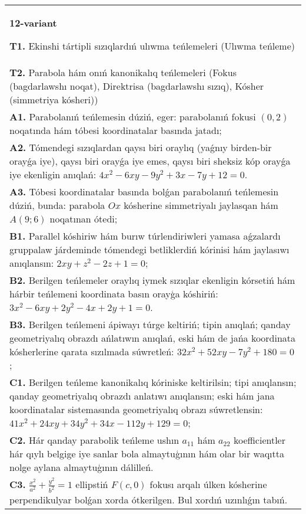 \documentclass{article}
\begin{document}
\begin{tabular}{m{17cm}}
\textbf{12-variant}
\newline

\textbf{T1.} Ekinshi tártipli sızıqlardıń ulıwma teńlemeleri (Ulıwma teńleme) \\
\textbf{T2.} Parabola hám onıń kanonikalıq teńlemeleri (Fokus (bagdarlawshı noqat), Direktrisa (bagdarlawshı sızıq), Kósher (simmetriya kósheri)) \\
\textbf{A1.} Parabolanıń teńlemesin dúziń, eger: parabolanıń fokusi $ (0,2) $ noqatında hám tóbesi koordinatalar basında jatadı; \\
\textbf{A2.} Tómendegi sızıqlardan qaysı biri oraylıq (yaǵnıy birden-bir orayǵa iye), qaysı biri orayǵa iye emes, qaysı biri sheksiz kóp orayǵa iye ekenligin anıqlań:  $4 x^2-6 x y-9 y^2+3 x-7 y+12=0$. \\
\textbf{A3.} Tóbesi koordinatalar basında bolǵan parabolanıń teńlemesin dúziń, bunda: parabola $Ox$ kósherine simmetriyalı jaylasqan hám $A (9; 6) $ noqatınan ótedi; \\
\textbf{B1.} Parallel kóshiriw hám burıw túrlendiriwleri yamasa aǵzalardı gruppalaw járdeminde tómendegi betliklerdiń kórinisi hám jaylasıwı anıqlansın: $2 x y+z^2-2 z+1=0$; \\
\textbf{B2.} Berilgen teńlemeler oraylıq iymek sızıqlar ekenligin kórsetiń hám hárbir teńlemeni koordinata basın orayģa kóshiriń: $3x^2-6xy+2y^2-4x+2y+1=0$. \\
\textbf{B3.} Berilgen teńlemeni ápiwayı túrge keltiriń; tipin anıqlań; qanday geometriyalıq obrazdı ańlatıwın anıqlań, eski hám de jańa koordinata kósherlerine qarata sızılmada súwretleń: $32 x^2+52 x y-7 y^2+180=0$; \\
\textbf{C1.} Berilgen teńleme kanonikalıq kóriniske keltirilsin; tipi anıqlansın; qanday geometriyalıq obrazdı anlatıwı anıqlansın; eski hám jana koordinatalar sistemasında geometriyalıq obrazı súwretlensin: $41 x^2+24 x y+34 y^2+34 x-112 y+129=0$; \\
\textbf{C2.} Hár qanday parabolik teńleme ushın $a_{11}$ hám $a_{22}$ koefficientler hár qıylı belgige iye sanlar bola almaytuģının hám olar bir waqıtta nolge aylana almaytuģının dálilleń. \\
\textbf{C3.} $\frac{x^2}{a^2}+\frac{y^2}{b^2}=1$ ellipstiń $F(c, 0)$ fokusı arqalı úlken kósherine perpendikulyar bolǵan xorda ótkerilgen. Bul xordıń uzınlıǵın tabıń. \\

\end{tabular}
\vspace{1cm}
\end{document}
